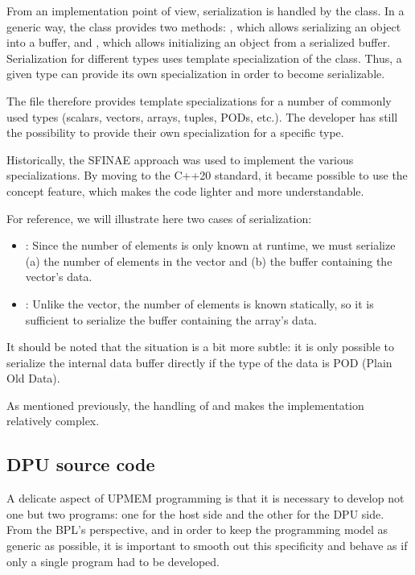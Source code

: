 From an implementation point of view, serialization is handled by the  class. In a generic way, the  class provides two methods:  , which allows serializing an object into a buffer, 
and , which allows initializing an object from a serialized buffer.
Serialization for different types uses template specialization of the  class.  Thus, a given type can provide its own specialization in order to become serializable.

The  file therefore provides template specializations for a number of commonly used types (scalars, vectors, arrays, tuples, PODs, etc.).
The developer has still the possibility to provide their own specialization for a specific type.

Historically, the SFINAE approach was used to implement the various specializations. By moving to the C++20 standard,  it became possible to use the concept feature, which makes the code lighter and more understandable.

For reference, we will illustrate here two cases of serialization:

\begin{itemize}
\item {}: Since the number of elements is only known at runtime, we must serialize (a) the number of elements in the vector and (b) the buffer containing the vector’s data.
\item {}: Unlike the vector, the number of elements is known statically, so it is sufficient  to serialize the buffer containing the array’s data.
\end{itemize} 
		
It should be noted that the situation is a bit more subtle: it is only possible to serialize the internal data buffer  directly if the type of the data is POD (Plain Old Data).

As mentioned previously, the handling of  and  makes the implementation relatively complex. 

 \subsection{DPU source code}

A delicate aspect of UPMEM programming is that it is necessary to develop not one but two programs: one for the host side and the other for the DPU side. From the BPL’s perspective, and in order to keep the programming model as generic as possible, it is important to smooth out this specificity and behave as if only a single program had to be developed.

